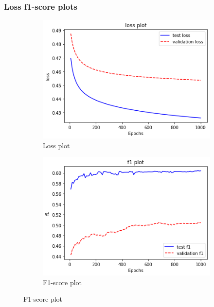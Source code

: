 \subsubsection{Loss f1-score plots}
\begin{figure}[h]
    \centering
    \begin{subfigure}[b]{0.5\textwidth}
                \includegraphics[width=\textwidth]{tex/img/loss_plot.png}
                \caption{Loss plot}
        \end{subfigure}%
        \hfill
    \begin{subfigure}[b]{0.5\textwidth}
                \includegraphics[width=\textwidth]{tex/img/f1_plot.png}
                \caption{F1-score plot}
       \end{subfigure}%
    \end{figure}


